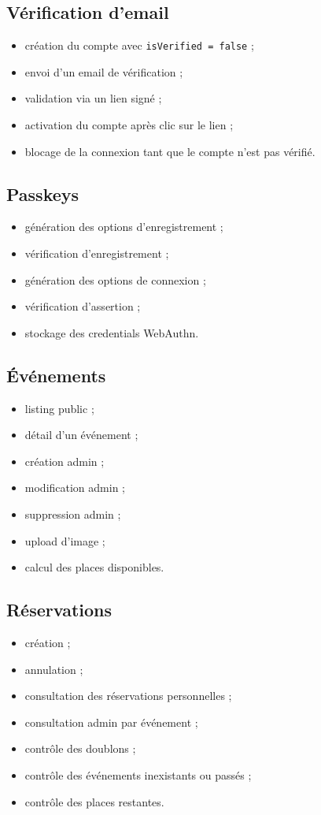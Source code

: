 \documentclass[12pt,a4paper]{report}
\begin{document}
\subsection{Vérification d'email}
\begin{itemize}[leftmargin=1.2cm]
    \item création du compte avec \texttt{isVerified = false} ;
    \item envoi d'un email de vérification ;
    \item validation via un lien signé ;
    \item activation du compte après clic sur le lien ;
    \item blocage de la connexion tant que le compte n'est pas vérifié.
\end{itemize}

\subsection{Passkeys}
\begin{itemize}[leftmargin=1.2cm]
    \item génération des options d'enregistrement ;
    \item vérification d'enregistrement ;
    \item génération des options de connexion ;
    \item vérification d'assertion ;
    \item stockage des credentials WebAuthn.
\end{itemize}

\subsection{Événements}
\begin{itemize}[leftmargin=1.2cm]
    \item listing public ;
    \item détail d'un événement ;
    \item création admin ;
    \item modification admin ;
    \item suppression admin ;
    \item upload d'image ;
    \item calcul des places disponibles.
\end{itemize}

\subsection{Réservations}
\begin{itemize}[leftmargin=1.2cm]
    \item création ;
    \item annulation ;
    \item consultation des réservations personnelles ;
    \item consultation admin par événement ;
    \item contrôle des doublons ;
    \item contrôle des événements inexistants ou passés ;
    \item contrôle des places restantes.
\end{itemize}
\end{document}
